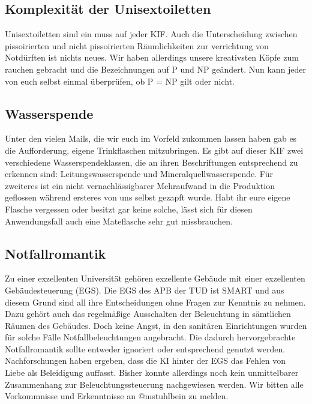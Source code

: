 \subsection*{Komplexität der Unisextoiletten}
Unisextoiletten sind ein muss auf jeder KIF. Auch die Unterscheidung zwischen pissoirierten und
nicht pissoirierten Räumlichkeiten zur verrichtung von Notdürften ist nichts neues. Wir haben
allerdings unsere kreativsten Köpfe zum rauchen gebracht und die Bezeichnungen auf P und NP
geändert. Nun kann jeder von euch selbst einmal überprüfen, ob P = NP gilt oder nicht.

\subsection*{Wasserspende}
Unter den vielen Mails, die wir euch im Vorfeld zukommen lassen haben gab es die Aufforderung,
eigene Trinkflaschen mitzubringen. Es gibt auf dieser KIF zwei verschiedene Wasserspendeklassen, die
an ihren Beschriftungen entsprechend zu erkennen sind: Leitungswasserspende und
Mineralquellwasserspende. Für zweiteres ist ein nicht vernachlässigbarer Mehraufwand in die
Produktion geflossen während ersteres von uns selbst gezapft wurde. Habt ihr eure eigene Flasche
vergessen oder besitzt gar keine solche, lässt sich für diesen Anwendungsfall auch eine Mateflasche
sehr gut missbrauchen.

\subsection*{Notfallromantik}
Zu einer exzellenten Universität gehören exzellente Gebäude mit einer exzellenten Gebäudesteuerung
(EGS). Die EGS des APB der TUD ist SMART und aus diesem Grund sind all ihre Entscheidungen ohne
Fragen zur Kenntnis zu nehmen. Dazu gehört auch das regelmäßige Ausschalten der Beleuchtung in
sämtlichen Räumen des Gebäudes. Doch keine Angst, in den sanitären Einrichtungen wurden für solche
Fälle Notfallbeleuchtungen angebracht. Die dadurch hervorgebrachte Notfallromantik sollte entweder
ignoriert oder entsprechend genutzt werden. Nachforschungen haben ergeben, dass die KI hinter der
EGS das Fehlen von Liebe als Beleidigung auffasst. Bisher konnte allerdings noch kein unmittelbarer
Zusammenhang zur Beleuchtungssteuerung nachgewiesen werden. Wir bitten alle Vorkommnisse und
Erkenntnisse an @mstuhlbein zu melden.
